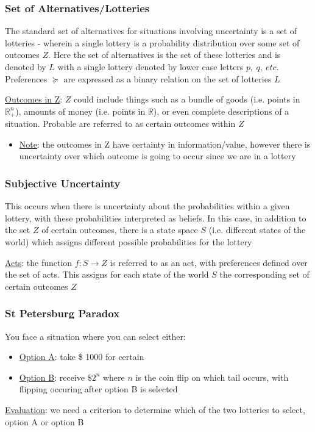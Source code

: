 \documentclass{article}
\begin{document}
\subsubsection{Set of Alternatives/Lotteries}
The standard set of alternatives for situations involving uncertainty is a set of lotteries - wherein a single lottery is a probability distribution over some set of outcomes $Z$. Here the set of alternatives is the set of these lotteries and is denoted by $L$ with a single lottery denoted by lower case letters $p, \ q, \ etc$. Preferences $\succeq$ are expressed as a binary relation on the set of lotteries $L$ \par \vspace{0.3em}
  \underline{Outcomes in Z}: $Z$ could include things such as a bundle of goods (i.e. points in $\mathbb{R}_{+}^{n}$), amounts of money (i.e. points in $\mathbb{R}$), or even complete descriptions of a situation. Probable are referred to as certain outcomes within $Z$
  \begin{itemize}
    \item \underline{Note}: the outcomes in Z have certainty in information/value, however there is uncertainty over which outcome is going to occur since we are in a lottery
  \end{itemize}
  \par
\vspace{6mm}
\subsubsection{Subjective Uncertainty}
This occurs when there is uncertainty about the probabilities within a given lottery, with these probabilities interpreted as beliefs. In this case, in addition to the set $Z$ of certain outcomes, there is a state space $S$ (i.e. different states of the world) which assigns different possible probabilities for the lottery \par \vspace{0.3em}
  \underline{Acts}: the function $f: S \rightarrow Z$ is referred to as an act, with preferences defined over the set of acts. This assigns for each state of the world $S$ the corresponding set of certain outcomes $Z$
  \par
\vspace{6mm}
\subsubsection{St Petersburg Paradox}
You face a situation where you can select either:
\begin{itemize}
  \item  \underline{Option A}: take \$ 1000 for certain
  \item  \underline{Option B}: receive $\$ 2^{n}$ where $n$ is the coin flip on which tail occurs, with flipping occuring after option B is selected
\end{itemize}
\par \vspace{0.3em}
  \underline{Evaluation}: we need a criterion to determine which of the two lotteries to select, option A or option B
  \par
\vspace{6mm}
\end{document}
